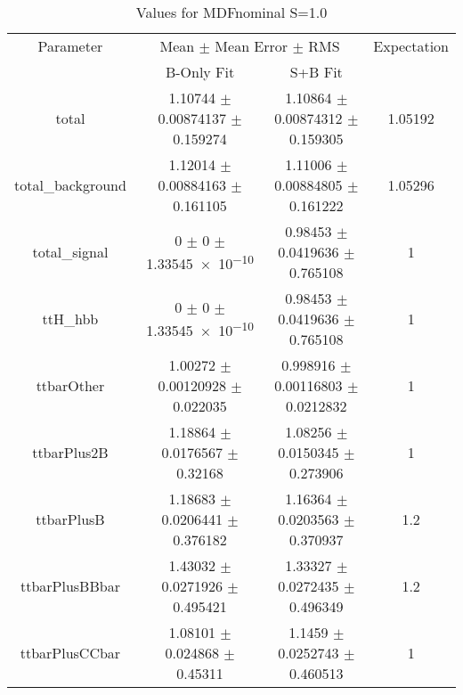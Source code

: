 \begin{table}
\centering
\caption{Values for MDFnominal S=1.0}
\begin{tabular}{cccc}
\toprule
Parameter & \multicolumn{2}{c}{Mean $\pm$ Mean Error $\pm$ RMS} & Expectation\\
 & B-Only Fit & S+B Fit & \\
\midrule
total & \num{1.10744} $\pm$ \num{0.00874137} $\pm$ \num{0.159274} & \num{1.10864} $\pm$ \num{0.00874312} $\pm$ \num{0.159305} & \num{1.05192}\\
total\_background & \num{1.12014} $\pm$ \num{0.00884163} $\pm$ \num{0.161105} & \num{1.11006} $\pm$ \num{0.00884805} $\pm$ \num{0.161222} & \num{1.05296}\\
total\_signal & \num{0} $\pm$ \num{0} $\pm$ \num{1.33545e-10} & \num{0.98453} $\pm$ \num{0.0419636} $\pm$ \num{0.765108} & \num{1}\\
ttH\_hbb & \num{0} $\pm$ \num{0} $\pm$ \num{1.33545e-10} & \num{0.98453} $\pm$ \num{0.0419636} $\pm$ \num{0.765108} & \num{1}\\
ttbarOther & \num{1.00272} $\pm$ \num{0.00120928} $\pm$ \num{0.022035} & \num{0.998916} $\pm$ \num{0.00116803} $\pm$ \num{0.0212832} & \num{1}\\
ttbarPlus2B & \num{1.18864} $\pm$ \num{0.0176567} $\pm$ \num{0.32168} & \num{1.08256} $\pm$ \num{0.0150345} $\pm$ \num{0.273906} & \num{1}\\
ttbarPlusB & \num{1.18683} $\pm$ \num{0.0206441} $\pm$ \num{0.376182} & \num{1.16364} $\pm$ \num{0.0203563} $\pm$ \num{0.370937} & \num{1.2}\\
ttbarPlusBBbar & \num{1.43032} $\pm$ \num{0.0271926} $\pm$ \num{0.495421} & \num{1.33327} $\pm$ \num{0.0272435} $\pm$ \num{0.496349} & \num{1.2}\\
ttbarPlusCCbar & \num{1.08101} $\pm$ \num{0.024868} $\pm$ \num{0.45311} & \num{1.1459} $\pm$ \num{0.0252743} $\pm$ \num{0.460513} & \num{1}\\
\bottomrule
\end{tabular}
\end{table}
